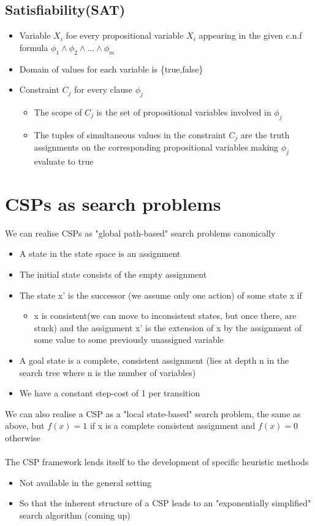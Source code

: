 \documentclass{article}[18pt]
\begin{document}
\subsection{Satisfiability(SAT)}
\begin{itemize}
	\item Variable $X_i$ foe every propositional variable $X_i$ appearing in the given c.n.f formula $\phi_1 \land \phi_2 \land ... \land \phi_m$
	\item Domain of values for each variable is \{true,false\}
	\item Constraint $C_j$ for every clause $\phi_j$
	\begin{itemize}
		\item The scope of $C_j$ is the set of propositional variables involved in $\phi_j$
		\item The tuples of simultaneous values in the constraint $C_j$ are the truth assignments on the corresponding propositional variables making $\phi_j$ evaluate to true
	\end{itemize}
\end{itemize}
\section{CSPs as search problems}
We can realise CSPs as "global path-based" search problems canonically
\begin{itemize}
	\item A state in the state space is an assignment
	\item The initial state consists of the empty assignment
	\item The state x' is the successor (we assume only one action) of some state x if
	\begin{itemize}
		\item x is consistent(we can move to inconsistent states, but once there, are stuck) and the assignment x' is the extension of x by the assignment of some value to some previously unassigned variable
	\end{itemize}
	\item A goal state is a complete, consistent assignment (lies at depth n in the search tree where n is the number of variables)
	\item We have a constant step-cost of 1 per transition
\end{itemize}
We can also realise a CSP as a "local state-based" search problem, the same as above, but $f(x)=1$ if x is a complete consistent assignment and $f(x)=0$ otherwise\\
\\
The CSP framework lends itself to the development of specific heuristic methods
\begin{itemize}
	\item Not available in the general setting
	\item So that the inherent structure of a CSP leads to an "exponentially simplified" search algorithm (coming up)
\end{itemize}
\end{document}
